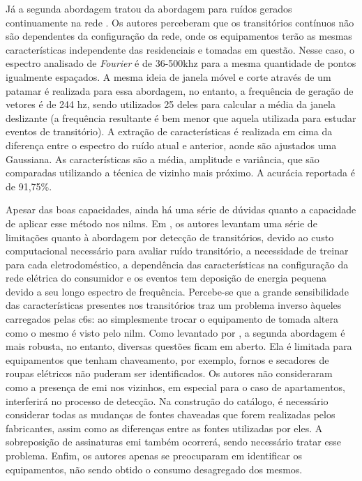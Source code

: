\begin{enumerate}[label=\textbf{2.\arabic*},wide=\parindent]
\begin{itemize}[wide=\parindent]
Já a segunda abordagem tratou da abordagem para ruídos gerados
continuamente na rede \cite{nilm_gupta_patel_2010_30}. Os autores
perceberam que os transitórios contínuos não são dependentes da
configuração da rede, onde os equipamentos terão as mesmas
características independente das residenciais e tomadas em questão.
Nesse caso, o espectro analisado de \emph{Fourier} é de
36-500k\acs{hz} para a mesma quantidade de pontos igualmente
espaçados. A mesma ideia de janela móvel e corte através de um patamar
é realizada para essa abordagem, no entanto, a frequência de geração
de vetores é de 244 \acs{hz}, sendo utilizados 25 deles para
calcular a média da janela deslizante (a frequência resultante é bem
menor que aquela utilizada para estudar eventos de transitório).
A extração de características é realizada em cima da diferença entre o
espectro do ruído atual e anterior, aonde são ajustados uma Gaussiana.
As características são a média, amplitude e variância, que são
comparadas utilizando a técnica de vizinho mais próximo. A acurácia
reportada é de 91,75\%.

Apesar das boas capacidades, ainda há uma série de dúvidas quanto a
capacidade de aplicar esse método nos \glspl{nilm}. Em
\cite{nilm_gupta_patel_2010_30}, os autores levantam uma série de
limitações quanto à abordagem por detecção de transitórios, devido ao
custo computacional necessário para avaliar ruído transitório, a
necessidade de treinar para cada eletrodoméstico, a dependência das
características na configuração da rede elétrica do consumidor e os
eventos tem deposição de energia pequena devido a seu longo espectro
de frequência. Percebe-se que a grande sensibilidade das
características presentes nos transitórios traz um problema inverso
àqueles carregados pelas \glspl{c6}: ao simplesmente trocar
o equipamento de tomada altera como o mesmo é visto pelo \gls{nilm}.
Como levantado por \cite{nilm_zeifman_review_2011}, a segunda
abordagem é mais robusta, no entanto, diversas questões ficam em
aberto. Ela é limitada para equipamentos que tenham chaveamento, por
exemplo, fornos e secadores de roupas elétricos não puderam ser
identificados. Os autores não consideraram como a presença de
\gls{emi} nos vizinhos, em especial para o caso de apartamentos,
interferirá no processo de detecção. Na construção do catálogo, é
necessário considerar todas as mudanças de fontes chaveadas que forem
realizadas pelos fabricantes, assim como as diferenças entre as fontes
utilizadas por eles. A sobreposição de assinaturas \gls{emi} também
ocorrerá, sendo necessário tratar esse problema. Enfim, os
autores apenas se preocuparam em identificar os equipamentos, não sendo
obtido o consumo desagregado dos mesmos.


\end{itemize}
\end{enumerate}
